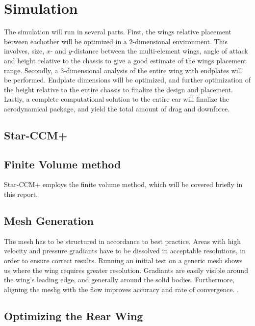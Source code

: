 \chapter{Simulation}

The simulation will run in several parts. First, the wings relative placement between eachother will be optimized in a 2-dimensional environment. This involves, size, $x$- and $y$-distance between the multi-element wings, angle of attack and height relative to the chassis to give a good estimate of the wings placement range. Secondly, a 3-dimensional analysis of the entire wing with endplates will be performed. Endplate dimensions will be optimized, and further optimization of the height relative to the entire chassis to finalize the design and placement. Lastly, a complete computational solution to the entire car will finalize the aerodynamical package, and yield the total amount of drag and downforce.

\section{Star-CCM+}

\section{Finite Volume method}

Star-CCM+ employs the finite volume method, which will be covered briefly in this report.

\section{Mesh Generation}

The mesh has to be structured in accordance to best practice. Areas with high velocity and pressure gradiants have to be dissolved in acceptable resolutions, in order to ensure correct results. Running an initial test on a generic mesh shows us where the wing requires greater resolution. Gradiants are easily visible around the wing's leading edge, and generally around the solid bodies. Furthermore, aligning the meshg with the flow improves accuracy and rate of convergence. .

\section{Optimizing the Rear Wing}


